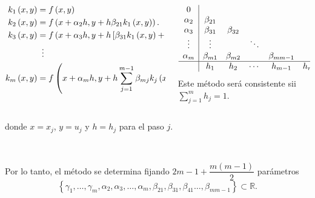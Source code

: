 \begin{frame}
\begin{definition}
    \begin{columns}
      \begin{column}{0.48\textwidth}
        \begin{align*}
          k_{1}\left(x,y\right) & =
          f\left(
          x,y
          \right)                                 \\
          k_{2}\left(x,y\right) & =
          f\left(
          x+\alpha_{2}h,
          y+h\beta_{21}k_{1}\left(x,y\right)
          \right).                                \\
          k_{3}\left(x,y\right) & =
          f\left(
          x+\alpha_{3}h,
          y+h\left[\beta_{31}k_{1}\left(x,y\right)+\beta_{32}k_{2}\left(x,y\right)\right]
          \right)                                 \\
                                & \vdotswithin{=} \\
          k_{m}\left(x,y\right) & =
          f\left(x+\alpha_{m}h,y+h\sum\limits_{j=1}^{m-1}\beta_{mj}k_{j}\left(x,y\right)\right),
        \end{align*}
      \end{column}
      \begin{column}{0.48\textwidth}
        \begin{equation*}
          \begin{array}
            {c|ccccc}
            0                                                                    \\
            \alpha_{2} & \beta_{21}                                              \\
            \alpha_{3} & \beta_{31} & \beta_{32}                                 \\
            \vdots     & \vdots     &            & \ddots                        \\
            \alpha_{m} & \beta_{m1} & \beta_{m2} &        & \beta_{mm-1}         \\
            \hline
                       & h_{1}      & h_{2}      & \cdots & h_{m-1}      & h_{m}
          \end{array}
        \end{equation*}
        Este método será \alert{consistente} sii
        \begin{math}
          \sum\limits_{j=1}^{m}
          h_{j}=1
        \end{math}.
      \end{column}
    \end{columns}
    donde $x=x_{j}$, $y=u_{j}$ y $h=h_{j}$ para el paso $j$.

    \

    Por lo tanto, el método se determina fijando
    $2m-1+\dfrac{m\left(m-1\right)}{2}$ parámetros
    \begin{equation*}
      \left\{
      \gamma_{1},\dotsc,\gamma_{m},
      \alpha_{2},\alpha_{3},\dotsc,\alpha_{m},
      \beta_{21},\beta_{31},\beta_{41}\dotsc,\beta_{mm-1}
      \right\}\subset
      \mathbb{R}.
    \end{equation*}
  \end{definition}
\end{frame}

